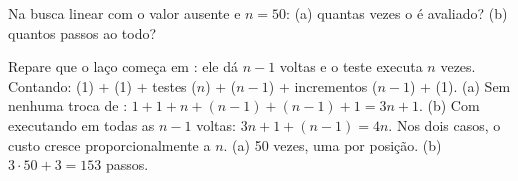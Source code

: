\begin{exrapido}
Na busca linear com o valor ausente e $n = 50$: (a) quantas vezes o  é avaliado?
(b) quantos passos ao todo?
\end{exrapido}

\begin{respostas}
   Repare que o laço começa em : ele dá $n - 1$ voltas e o teste
   executa $n$ vezes. Contando:  (1) +  (1) +
  testes ($n$) +  ($n - 1$) + incrementos ($n - 1$) +  (1).
  (a) Sem nenhuma troca de : $1 + 1 + n + (n-1) + (n-1) + 1 = 3n + 1$.
  (b) Com  executando em todas as $n - 1$ voltas: $3n + 1 + (n - 1) = 4n$.
  Nos dois casos, o custo cresce proporcionalmente a $n$.
   (a) 50 vezes, uma por posição. (b) $3 \cdot 50 + 3 = 153$ passos.
\end{respostas}
